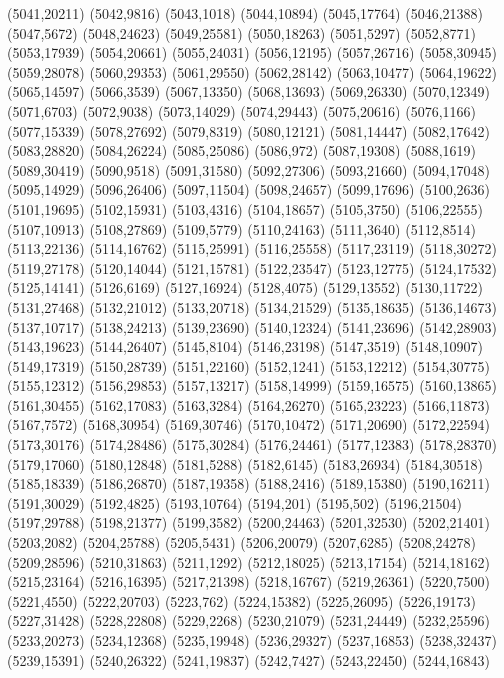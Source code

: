 (5041,20211)
(5042,9816)
(5043,1018)
(5044,10894)
(5045,17764)
(5046,21388)
(5047,5672)
(5048,24623)
(5049,25581)
(5050,18263)
(5051,5297)
(5052,8771)
(5053,17939)
(5054,20661)
(5055,24031)
(5056,12195)
(5057,26716)
(5058,30945)
(5059,28078)
(5060,29353)
(5061,29550)
(5062,28142)
(5063,10477)
(5064,19622)
(5065,14597)
(5066,3539)
(5067,13350)
(5068,13693)
(5069,26330)
(5070,12349)
(5071,6703)
(5072,9038)
(5073,14029)
(5074,29443)
(5075,20616)
(5076,1166)
(5077,15339)
(5078,27692)
(5079,8319)
(5080,12121)
(5081,14447)
(5082,17642)
(5083,28820)
(5084,26224)
(5085,25086)
(5086,972)
(5087,19308)
(5088,1619)
(5089,30419)
(5090,9518)
(5091,31580)
(5092,27306)
(5093,21660)
(5094,17048)
(5095,14929)
(5096,26406)
(5097,11504)
(5098,24657)
(5099,17696)
(5100,2636)
(5101,19695)
(5102,15931)
(5103,4316)
(5104,18657)
(5105,3750)
(5106,22555)
(5107,10913)
(5108,27869)
(5109,5779)
(5110,24163)
(5111,3640)
(5112,8514)
(5113,22136)
(5114,16762)
(5115,25991)
(5116,25558)
(5117,23119)
(5118,30272)
(5119,27178)
(5120,14044)
(5121,15781)
(5122,23547)
(5123,12775)
(5124,17532)
(5125,14141)
(5126,6169)
(5127,16924)
(5128,4075)
(5129,13552)
(5130,11722)
(5131,27468)
(5132,21012)
(5133,20718)
(5134,21529)
(5135,18635)
(5136,14673)
(5137,10717)
(5138,24213)
(5139,23690)
(5140,12324)
(5141,23696)
(5142,28903)
(5143,19623)
(5144,26407)
(5145,8104)
(5146,23198)
(5147,3519)
(5148,10907)
(5149,17319)
(5150,28739)
(5151,22160)
(5152,1241)
(5153,12212)
(5154,30775)
(5155,12312)
(5156,29853)
(5157,13217)
(5158,14999)
(5159,16575)
(5160,13865)
(5161,30455)
(5162,17083)
(5163,3284)
(5164,26270)
(5165,23223)
(5166,11873)
(5167,7572)
(5168,30954)
(5169,30746)
(5170,10472)
(5171,20690)
(5172,22594)
(5173,30176)
(5174,28486)
(5175,30284)
(5176,24461)
(5177,12383)
(5178,28370)
(5179,17060)
(5180,12848)
(5181,5288)
(5182,6145)
(5183,26934)
(5184,30518)
(5185,18339)
(5186,26870)
(5187,19358)
(5188,2416)
(5189,15380)
(5190,16211)
(5191,30029)
(5192,4825)
(5193,10764)
(5194,201)
(5195,502)
(5196,21504)
(5197,29788)
(5198,21377)
(5199,3582)
(5200,24463)
(5201,32530)
(5202,21401)
(5203,2082)
(5204,25788)
(5205,5431)
(5206,20079)
(5207,6285)
(5208,24278)
(5209,28596)
(5210,31863)
(5211,1292)
(5212,18025)
(5213,17154)
(5214,18162)
(5215,23164)
(5216,16395)
(5217,21398)
(5218,16767)
(5219,26361)
(5220,7500)
(5221,4550)
(5222,20703)
(5223,762)
(5224,15382)
(5225,26095)
(5226,19173)
(5227,31428)
(5228,22808)
(5229,2268)
(5230,21079)
(5231,24449)
(5232,25596)
(5233,20273)
(5234,12368)
(5235,19948)
(5236,29327)
(5237,16853)
(5238,32437)
(5239,15391)
(5240,26322)
(5241,19837)
(5242,7427)
(5243,22450)
(5244,16843)
